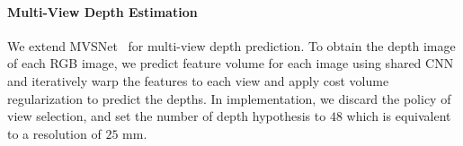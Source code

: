 \paragraph{Multi-View Depth Estimation}\vspace{-4mm}
We extend MVSNet~\cite{yao2018mvsnet} for multi-view depth prediction.
To obtain the depth image of each RGB image, we predict feature volume for each image using shared CNN and iteratively warp the features to each view and apply cost volume regularization to predict the depths.
In implementation, we discard the policy of view selection, and set the number of depth hypothesis to $48$ which is equivalent to a resolution of $25$ mm.





